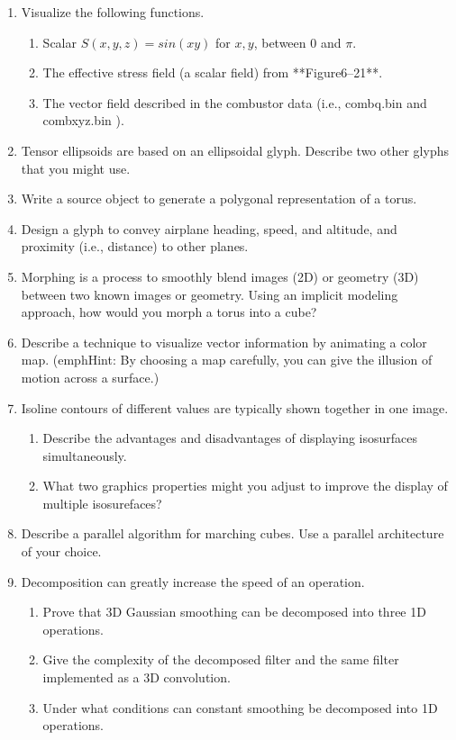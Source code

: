 \begin{enumerate}
\item Visualize the following functions.
\begin{enumerate}
	\item Scalar $S(x,y,z)=sin(xy)$ for $x,y$, between $0$ and $\pi$.
	\item The effective stress field (a scalar field) from **Figure6–21**.
	\item The vector field described in the combustor data (i.e., combq.bin and combxyz.bin ).
\end{enumerate}

\item Tensor ellipsoids are based on an ellipsoidal glyph. Describe two other glyphs that you might use.

\item Write a source object to generate a polygonal representation of a torus.

\item Design a glyph to convey airplane heading, speed, and altitude, and proximity (i.e., distance) to other planes.

\item Morphing is a process to smoothly blend images (2D) or geometry (3D) between two known images or geometry. Using an implicit modeling approach, how would you morph a torus into a cube?

\item Describe a technique to visualize vector information by animating a color map. (emph{Hint:} By choosing a map carefully, you can give the illusion of motion across a surface.)

\item Isoline contours of different values are typically shown together in one image.
\begin{enumerate}
	\item Describe the advantages and disadvantages of displaying isosurfaces simultaneously.
	\item What two graphics properties might you adjust to improve the display of multiple isosurefaces?
\end{enumerate}

\item Describe a parallel algorithm for marching cubes. Use a parallel architecture of your choice.

\item Decomposition can greatly increase the speed of an operation.
\begin{enumerate}
	\item  Prove that 3D Gaussian smoothing can be decomposed into three 1D operations.
	\item Give the complexity of the decomposed filter and the same filter implemented as a 3D convolution.
	\item Under what conditions can constant smoothing be decomposed into 1D operations.
\end{enumerate}

\end{enumerate}
